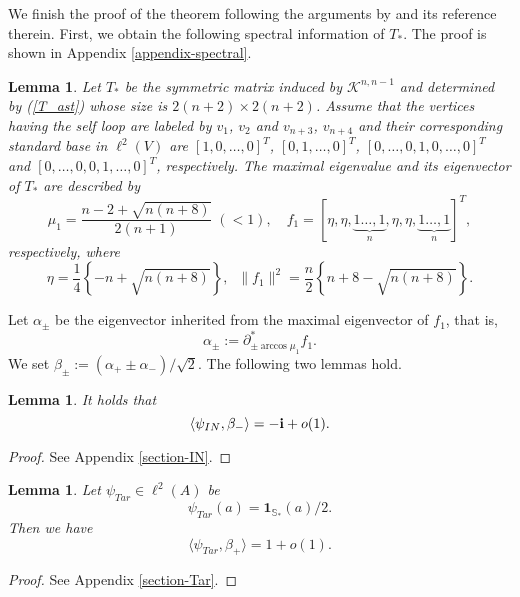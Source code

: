 \documentclass[a4paper,12pt]{article}
\newtheorem{lemma}[definition]{Lemma}
\newcommand{\bs}[1]{\boldsymbol{#1}}
\newcommand{\im}{\bs{\rm i}}
\numberwithin{equation}{section}
\begin{document}
We finish the proof of the theorem following the arguments by \cite{P2013} and its reference therein.
First, we obtain the following spectral information of $T_\ast$. 
The proof is shown in Appendix \ref{appendix-spectral}. 
%
\begin{lemma}
\label{lem-spectral}
Let $T_\ast$ be the symmetric matrix induced by $\mathcal{K}^{n,n-1}$ and determined by (\ref{T_ast}) 
whose size is $2(n+2) \times 2(n+2)$. 
Assume that the vertices having the self loop are labeled by $v_1$, $v_2$ and $v_{n+3}$, $v_{n+4}$ and their corresponding 
standard base in $\ell^2(V)$ are $[1,0,\dots,0]^{T}$, $[0,1,\dots,0]^{T}$, $[0,\dots,0,1,0,\dots,0]^{T}$ and $[0,\dots,0,0,1,\dots,0]^{T}$, respectively. 
The maximal eigenvalue and its eigenvector of $T_\ast$ are described by 
\begin{equation*}
\mu_1 = \frac{n-2+\sqrt{n(n+8)}}{2(n+1)}\;(<1), \quad f_1 =[\eta,\eta,\underbrace{1\dots,1}_{n},\eta,\eta,\underbrace{1\dots,1}_{n}]^T,
\end{equation*}
respectively, where
\begin{equation*}
\eta=\frac{1}{4}\left\{ -n+\sqrt{n(n+8)} \right\},\;\; \|f_1\|^2 = \frac{n}{2} \left\{ n+8-\sqrt{n(n+8)} \right\}. 
\end{equation*}	
\end{lemma}
%
Let $\alpha_\pm$ be the eigenvector inherited from the maximal eigenvector of $f_1$, that is, 
	\[ \alpha_\pm:= \partial^*_{\pm \arccos \mu_1} f_1. \]
We set $\beta_\pm:=(\alpha_+ \pm \alpha_-)/\sqrt{2}$. 
The following two lemmas hold. 
\begin{lemma}
\label{IN}
It holds that
\begin{equation*}
\langle \psi_{IN}, \beta_- \rangle=-\im+o(1).
\end{equation*}
\end{lemma}
\begin{proof}
See Appendix \ref{section-IN}.
\end{proof}
%
\begin{lemma}
\label{Tar}
Let $\psi_{Tar}\in \ell^2(A)$ be 
\begin{equation*}
\psi_{Tar}(a)=\bs{1}_{\mathbb{S}_\ast}(a)/2.
\end{equation*}
Then we have
\begin{equation*}
\langle \psi_{Tar}, \beta_+ \rangle=1+o(1).
\end{equation*}
\end{lemma}
\begin{proof}
See Appendix \ref{section-Tar}.
\end{proof}
\end{document}
